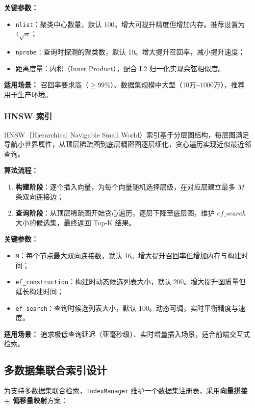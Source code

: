 \documentclass[a4paper]{article}
\begin{document}
\textbf{关键参数：}
\begin{itemize}
    \item \texttt{nlist}：聚类中心数量，默认 100。增大可提升精度但增加内存。推荐设置为 $4\sqrt{n}$；
    \item \texttt{nprobe}：查询时探测的聚类数，默认 10。增大提升召回率，减小提升速度；
    \item 距离度量：内积（Inner Product），配合 L2 归一化实现余弦相似度。
\end{itemize}

\textbf{适用场景：} 召回率要求高（$\geq 99\%$）、数据集规模中大型（10万\textasciitilde1000万），推荐用于生产环境。

\subsubsection{HNSW 索引}
HNSW（Hierarchical Navigable Small World）索引基于分层图结构，每层图满足导航小世界属性，从顶层稀疏图到底层稠密图逐层细化，贪心遍历实现近似最近邻查询。

\textbf{算法流程：}
\begin{enumerate}
    \item \textbf{构建阶段}：逐个插入向量，为每个向量随机选择层级，在对应层建立最多 $M$ 条双向连接边；
    \item \textbf{查询阶段}：从顶层稀疏图开始贪心遍历，逐层下降至底层图，维护 $ef\_search$ 大小的候选集，最终返回 Top-K 结果。
\end{enumerate}

\textbf{关键参数：}
\begin{itemize}
    \item \texttt{M}：每个节点最大双向连接数，默认 16。增大提升召回率但增加内存与构建时间；
    \item \texttt{ef\_construction}：构建时动态候选列表大小，默认 200。增大提升图质量但延长构建时间；
    \item \texttt{ef\_search}：查询时候选列表大小，默认 100。动态可调，实时平衡精度与速度。
\end{itemize}

\textbf{适用场景：} 追求极低查询延迟（亚毫秒级）、实时增量插入场景，适合前端交互式检索。

\subsection{多数据集联合索引设计}
为支持多数据集联合检索，\texttt{IndexManager} 维护一个数据集注册表，采用\textbf{向量拼接 + 偏移量映射}方案：
\end{document}
